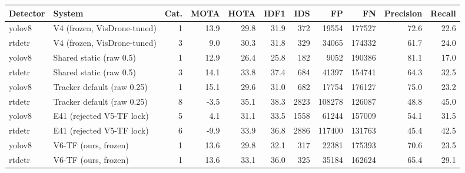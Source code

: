 \begin{tabular}{llrrrrrrrrr}
\toprule
Detector & System & Cat. & MOTA & HOTA & IDF1 & IDS & FP & FN & Precision & Recall \\
\midrule
yolov8 & V4 (frozen, VisDrone-tuned) & 1 & 13.9 & 29.8 & 31.9 & 372 & 19554 & 177527 & 72.6 & 22.6 \\
rtdetr & V4 (frozen, VisDrone-tuned) & 3 & 9.0 & 30.3 & 31.8 & 329 & 34065 & 174332 & 61.7 & 24.0 \\
yolov8 & Shared static (raw 0.5) & 1 & 12.9 & 26.4 & 25.8 & 182 & 9052 & 190386 & 81.1 & 17.0 \\
rtdetr & Shared static (raw 0.5) & 3 & 14.1 & 33.8 & 37.4 & 684 & 41397 & 154741 & 64.3 & 32.5 \\
yolov8 & Tracker default (raw 0.25) & 1 & 15.1 & 29.6 & 31.0 & 682 & 17754 & 176127 & 75.0 & 23.2 \\
rtdetr & Tracker default (raw 0.25) & 8 & -3.5 & 35.1 & 38.3 & 2823 & 108278 & 126087 & 48.8 & 45.0 \\
yolov8 & E41 (rejected V5-TF lock) & 5 & 4.1 & 31.1 & 33.5 & 1558 & 61244 & 157009 & 54.1 & 31.5 \\
rtdetr & E41 (rejected V5-TF lock) & 6 & -9.9 & 33.9 & 36.8 & 2886 & 117400 & 131763 & 45.4 & 42.5 \\
yolov8 & V6-TF (ours, frozen) & 1 & 13.6 & 29.8 & 32.1 & 317 & 22381 & 175393 & 70.6 & 23.5 \\
rtdetr & V6-TF (ours, frozen) & 1 & 13.6 & 33.1 & 36.0 & 325 & 35184 & 162624 & 65.4 & 29.1 \\
\bottomrule
\end{tabular}

